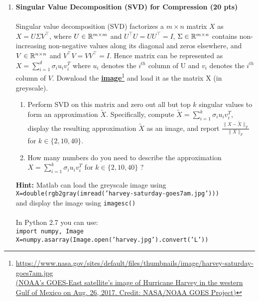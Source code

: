 \begin{enumerate}
    \item \textbf{Singular Value Decomposition (SVD) for Compression (20 pts)}\\\\
        Singular value decomposition (SVD) factorizes a $m \times n$ matrix $X$ as $X = U \Sigma V^{\top}$, where $U \in \mathbb{R}^{m \times m}$ and $U^{\top}U = UU^{\top} = I$, $\Sigma \in \mathbb{R}^{m \times n}$ contains non-increasing non-negative values along its diagonal and zeros elsewhere, and $V \in \mathbb{R}^{n \times n}$ and $V^{\top}V = VV^{\top} = I$. Hence matrix can be represented as $X=\sum_{i=1}^d \sigma_i u_i v_i^T$ where $u_i$ denotes the $i^{th}$ column of U and $v_i$ denotes the $i^{th}$ column of $V$. Download the \href{https://www.nasa.gov/sites/default/files/thumbnails/image/harvey-saturday-goes7am.jpg}{\bf image}\footnote{\href{https://www.nasa.gov/sites/default/files/thumbnails/image/harvey-saturday-goes7am.jpg}{https://www.nasa.gov/sites/default/files/thumbnails/image/harvey-saturday-goes7am.jpg \\(NOAA's GOES-East satellite's image of Hurricane Harvey in the western Gulf of Mexico on Aug. 26, 2017. Credit: NASA/NOAA GOES Project)}} and load it as the matrix X (in greyscale). 
\begin{enumerate}
    \item Perform SVD on this matrix and zero out all but top $k$ singular values to form an approximation $\tilde X$. Specifically, compute $\tilde  X=\sum_{i=1}^k \sigma_i u_i v_i^T$, display the resulting approximation $\tilde X$ as an image, and report $\frac{\|X-\tilde X\|_{F}}{\|X\|_F}$ for $k\in\{2, 10, 40\}$.
    \item How many numbers do you need to describe the approximation $X=\sum_{i=1}^k \sigma_i u_i v_i^T$ for $k\in\{2, 10, 40\}$ ?
\end{enumerate}
 \textbf{Hint:} Matlab can load the greyscale image using\\
 \texttt{X=double(rgb2gray(imread('harvey-saturday-goes7am.jpg')))}\\
 and display the image using \texttt{imagesc()}\\
 ~\\
 In Python 2.7 you can use:\\
 \texttt{import numpy, Image\\
X=numpy.asarray(Image.open('harvey.jpg').convert('L'))}
\\
\solution{

}
\end{enumerate}
